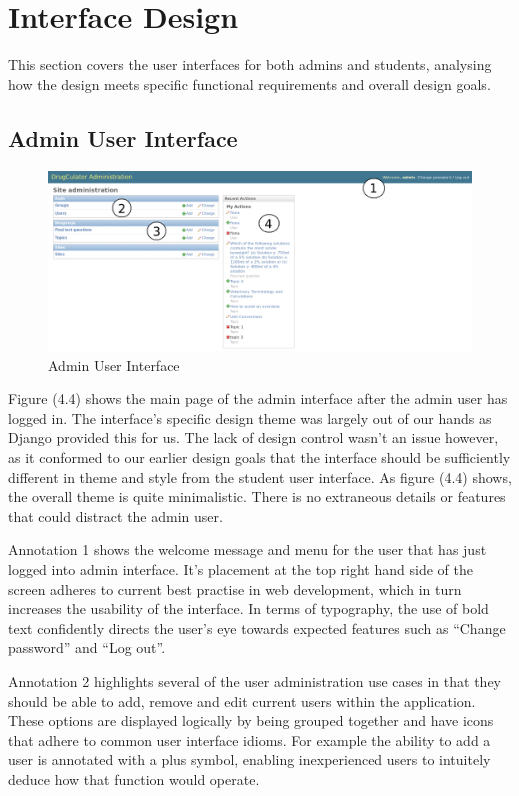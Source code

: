 \documentclass{l3proj}
\begin{document}
\section{Interface Design}

This section covers the user interfaces for both admins and students, analysing how the design meets specific functional requirements and overall design goals.

\subsection{Admin User Interface}

\begin{figure}[!htb]
\caption{Admin User Interface}
\includegraphics[width=\linewidth]{images/admin_interface1.png}
\end{figure}

Figure (4.4) shows the main page of the admin interface after the admin user has logged in. The interface's specific design theme was largely out of our hands as Django provided this for us. The lack of design control wasn't an issue however, as it conformed to our earlier design goals that the interface should be sufficiently different in theme and style from the student user interface. As figure (4.4) shows, the overall theme is quite minimalistic. There is no extraneous details or features that could distract the admin user.

Annotation 1 shows the welcome message and menu for the user that has just logged into admin interface. It's placement at the top right hand side of the screen adheres to current best practise in web development, which in turn increases the usability of the interface. In terms of typography, the use of bold text confidently directs the user's eye towards expected features such as ``Change password'' and ``Log out''.

Annotation 2 highlights several of the user administration use cases in that they should be able to add, remove and edit current users within the application. These options are displayed logically by being grouped together and have icons that adhere to common user interface idioms. For example the ability to add a user is annotated with a plus symbol, enabling inexperienced users to intuitely deduce how that function would operate. 
\end{document}
